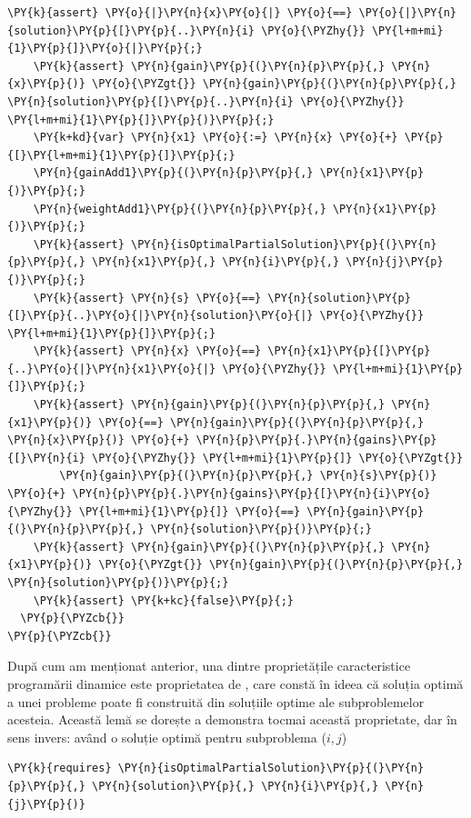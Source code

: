 \begin{sloppypar}
\begin{enumerate}
\begin{Verbatim}[commandchars=\\\{\}]
    \PY{k}{assert} \PY{o}{|}\PY{n}{x}\PY{o}{|} \PY{o}{==} \PY{o}{|}\PY{n}{solution}\PY{p}{[}\PY{p}{..}\PY{n}{i} \PY{o}{\PYZhy{}} \PY{l+m+mi}{1}\PY{p}{]}\PY{o}{|}\PY{p}{;}
    \PY{k}{assert} \PY{n}{gain}\PY{p}{(}\PY{n}{p}\PY{p}{,} \PY{n}{x}\PY{p}{)} \PY{o}{\PYZgt{}} \PY{n}{gain}\PY{p}{(}\PY{n}{p}\PY{p}{,} \PY{n}{solution}\PY{p}{[}\PY{p}{..}\PY{n}{i} \PY{o}{\PYZhy{}} \PY{l+m+mi}{1}\PY{p}{]}\PY{p}{)}\PY{p}{;}
    \PY{k+kd}{var} \PY{n}{x1} \PY{o}{:=} \PY{n}{x} \PY{o}{+} \PY{p}{[}\PY{l+m+mi}{1}\PY{p}{]}\PY{p}{;}
    \PY{n}{gainAdd1}\PY{p}{(}\PY{n}{p}\PY{p}{,} \PY{n}{x1}\PY{p}{)}\PY{p}{;}
    \PY{n}{weightAdd1}\PY{p}{(}\PY{n}{p}\PY{p}{,} \PY{n}{x1}\PY{p}{)}\PY{p}{;}
    \PY{k}{assert} \PY{n}{isOptimalPartialSolution}\PY{p}{(}\PY{n}{p}\PY{p}{,} \PY{n}{x1}\PY{p}{,} \PY{n}{i}\PY{p}{,} \PY{n}{j}\PY{p}{)}\PY{p}{;}
    \PY{k}{assert} \PY{n}{s} \PY{o}{==} \PY{n}{solution}\PY{p}{[}\PY{p}{..}\PY{o}{|}\PY{n}{solution}\PY{o}{|} \PY{o}{\PYZhy{}} \PY{l+m+mi}{1}\PY{p}{]}\PY{p}{;}
    \PY{k}{assert} \PY{n}{x} \PY{o}{==} \PY{n}{x1}\PY{p}{[}\PY{p}{..}\PY{o}{|}\PY{n}{x1}\PY{o}{|} \PY{o}{\PYZhy{}} \PY{l+m+mi}{1}\PY{p}{]}\PY{p}{;}
    \PY{k}{assert} \PY{n}{gain}\PY{p}{(}\PY{n}{p}\PY{p}{,} \PY{n}{x1}\PY{p}{)} \PY{o}{==} \PY{n}{gain}\PY{p}{(}\PY{n}{p}\PY{p}{,} \PY{n}{x}\PY{p}{)} \PY{o}{+} \PY{n}{p}\PY{p}{.}\PY{n}{gains}\PY{p}{[}\PY{n}{i} \PY{o}{\PYZhy{}} \PY{l+m+mi}{1}\PY{p}{]} \PY{o}{\PYZgt{}} 
        \PY{n}{gain}\PY{p}{(}\PY{n}{p}\PY{p}{,} \PY{n}{s}\PY{p}{)} \PY{o}{+} \PY{n}{p}\PY{p}{.}\PY{n}{gains}\PY{p}{[}\PY{n}{i}\PY{o}{\PYZhy{}} \PY{l+m+mi}{1}\PY{p}{]} \PY{o}{==} \PY{n}{gain}\PY{p}{(}\PY{n}{p}\PY{p}{,} \PY{n}{solution}\PY{p}{)}\PY{p}{;}
    \PY{k}{assert} \PY{n}{gain}\PY{p}{(}\PY{n}{p}\PY{p}{,} \PY{n}{x1}\PY{p}{)} \PY{o}{\PYZgt{}} \PY{n}{gain}\PY{p}{(}\PY{n}{p}\PY{p}{,} \PY{n}{solution}\PY{p}{)}\PY{p}{;}
    \PY{k}{assert} \PY{k+kc}{false}\PY{p}{;}
  \PY{p}{\PYZcb{}}
\PY{p}{\PYZcb{}}
\end{Verbatim}
     După cum am menționat anterior, una dintre proprietățile caracteristice programării dinamice este proprietatea de , care constă în ideea că soluția optimă a unei probleme poate fi construită din soluțiile optime ale subproblemelor acesteia. Această lemă se dorește a demonstra tocmai această proprietate, dar în sens invers: având o soluție optimă pentru subproblema ($i, j$) 
     \begin{Verbatim}[commandchars=\\\{\}]
\PY{k}{requires} \PY{n}{isOptimalPartialSolution}\PY{p}{(}\PY{n}{p}\PY{p}{,} \PY{n}{solution}\PY{p}{,} \PY{n}{i}\PY{p}{,} \PY{n}{j}\PY{p}{)}

\end{Verbatim}
\end{enumerate}
\end{sloppypar}

